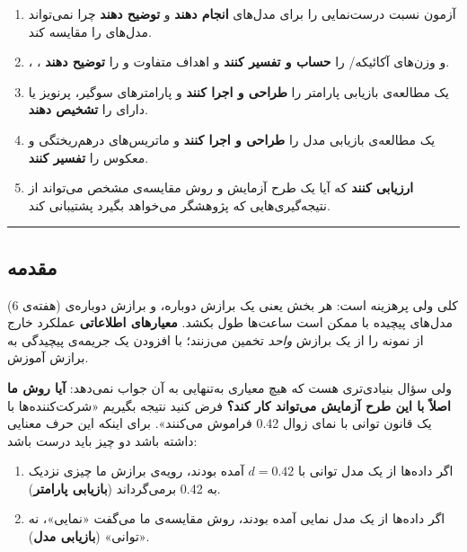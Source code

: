 \begin{enumerate}
\def\labelenumi{\arabic{enumi}.}
\tightlist
\item
  آزمون نسبت درست‌نمایی را برای مدل‌های  \textbf{انجام دهند} و
  \textbf{توضیح دهند} چرا نمی‌تواند مدل‌های  را مقایسه کند.
\item
  ، ،  و وزن‌های آکائیکه/ را
  \textbf{حساب و تفسیر کنند} و اهداف متفاوت  و  را
  \textbf{توضیح دهند}.
\item
  یک مطالعه‌ی بازیابی پارامتر را \textbf{طراحی و اجرا کنند} و پارامترهای
  سوگیر، پرنویز یا دارای  را \textbf{تشخیص دهند}.
\item
  یک مطالعه‌ی بازیابی مدل را \textbf{طراحی و اجرا کنند} و ماتریس‌های
  درهم‌ریختگی و معکوس را \textbf{تفسیر کنند}.
\item
  \textbf{ارزیابی کنند} که آیا یک طرح آزمایش و روش مقایسه‌ی مشخص می‌تواند
  از نتیجه‌گیری‌هایی که پژوهشگر می‌خواهد بگیرد پشتیبانی کند.
\end{enumerate}

\begin{center}\rule{0.5\linewidth}{0.5pt}\end{center}

\subsection{مقدمه}

 (هفته‌ی 6) کلی ولی پرهزینه است: هر بخش یعنی یک
برازش دوباره، و برازش دوباره‌ی مدل‌های پیچیده با  ممکن است
ساعت‌ها طول بکشد. \textbf{معیارهای اطلاعاتی} عملکرد خارج از نمونه را از
یک برازش \emph{واحد} تخمین می‌زنند؛ با افزودن یک جریمه‌ی پیچیدگی به برازش
آموزش.

ولی سؤال بنیادی‌تری هست که هیچ معیاری به‌تنهایی به آن جواب نمی‌دهد:
\textbf{آیا روش ما اصلاً با این طرح آزمایش می‌تواند کار کند؟} فرض کنید
نتیجه بگیریم «شرکت‌کننده‌ها با یک قانون توانی با نمای زوال 0.42 فراموش
می‌کنند». برای اینکه این حرف معنایی داشته باشد دو چیز باید درست باشد:

\begin{enumerate}
\def\labelenumi{\arabic{enumi}.}
\tightlist
\item
  اگر داده‌ها از یک مدل توانی با \(d = 0.42\) آمده بودند، رویه‌ی برازش ما
  چیزی نزدیک به 0.42 برمی‌گرداند (\textbf{بازیابی پارامتر}).
\item
  اگر داده‌ها از یک مدل نمایی آمده بودند، روش مقایسه‌ی ما می‌گفت «نمایی»،
  نه «توانی» (\textbf{بازیابی مدل}).
\end{enumerate}

